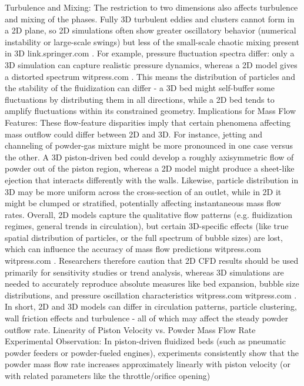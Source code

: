 Turbulence and Mixing: The restriction to two dimensions also affects turbulence and mixing of the phases. Fully 3D turbulent eddies and clusters cannot form in a 2D plane, so 2D simulations often show greater oscillatory behavior (numerical instability or large-scale swings) but less of the small-scale chaotic mixing present in 3D
link.springer.com
. For example, pressure fluctuation spectra differ: only a 3D simulation can capture realistic pressure dynamics, whereas a 2D model gives a distorted spectrum
witpress.com
. This means the distribution of particles and the stability of the fluidization can differ - a 3D bed might self-buffer some fluctuations by distributing them in all directions, while a 2D bed tends to amplify fluctuations within its constrained geometry.
Implications for Mass Flow Features: These flow-feature disparities imply that certain phenomena affecting mass outflow could differ between 2D and 3D. For instance, jetting and channeling of powder-gas mixture might be more pronounced in one case versus the other. A 3D piston-driven bed could develop a roughly axisymmetric flow of powder out of the piston region, whereas a 2D model might produce a sheet-like ejection that interacts differently with the walls. Likewise, particle distribution in 3D may be more uniform across the cross-section of an outlet, while in 2D it might be clumped or stratified, potentially affecting instantaneous mass flow rates. Overall, 2D models capture the qualitative flow patterns (e.g. fluidization regimes, general trends in circulation), but certain 3D-specific effects (like true spatial distribution of particles, or the full spectrum of bubble sizes) are lost, which can influence the accuracy of mass flow predictions
witpress.com
witpress.com
. Researchers therefore caution that 2D CFD results should be used primarily for sensitivity studies or trend analysis, whereas 3D simulations are needed to accurately reproduce absolute measures like bed expansion, bubble size distributions, and pressure oscillation characteristics
witpress.com
witpress.com
. In short, 2D and 3D models can differ in circulation patterns, particle clustering, wall friction effects and turbulence - all of which may affect the steady powder outflow rate.
Linearity of Piston Velocity vs. Powder Mass Flow Rate
Experimental Observation: In piston-driven fluidized beds (such as pneumatic powder feeders or powder-fueled engines), experiments consistently show that the powder mass flow rate increases approximately linearly with piston velocity (or with related parameters like the throttle/orifice opening)
